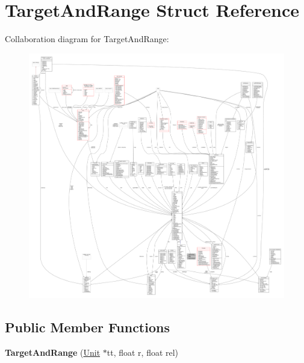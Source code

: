 \hypertarget{structTargetAndRange}{}\section{Target\+And\+Range Struct Reference}
\label{structTargetAndRange}


Collaboration diagram for Target\+And\+Range\+:
\nopagebreak
\begin{figure}[H]
\begin{center}
\leavevmode
\includegraphics[width=350pt]{d4/dbb/structTargetAndRange__coll__graph}
\end{center}
\end{figure}
\subsection*{Public Member Functions}
\begin{DoxyCompactItemize}
\item 
{\bfseries Target\+And\+Range} (\hyperlink{classUnit}{Unit} $\ast$tt, float r, float rel)\hypertarget{structTargetAndRange_a741dc23ff4e1b5e889890ead3e80da45}{}\label{structTargetAndRange_a741dc23ff4e1b5e889890ead3e80da45}

\end{DoxyCompactItemize}
